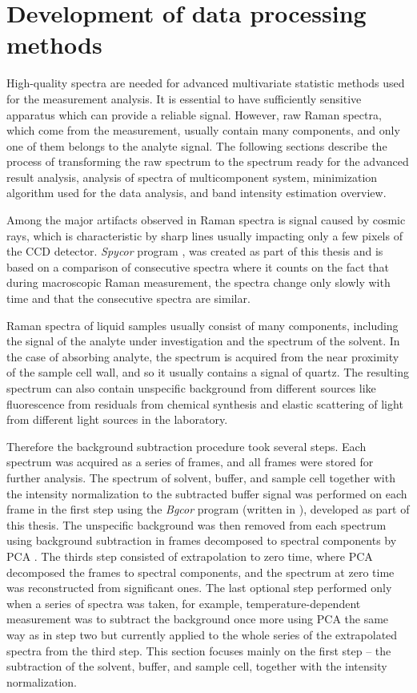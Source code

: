 \section{Development of data processing methods}
\label{data_processing}

High-quality spectra are needed for advanced multivariate statistic methods
used for the measurement analysis.
It is essential to have sufficiently sensitive apparatus which can provide a
reliable signal.
However, raw Raman spectra, which come from the measurement, usually contain
many components, and only one of them belongs to the analyte signal.
The following sections describe the process of transforming the raw spectrum
to the spectrum ready for the advanced result analysis, analysis
of spectra of multicomponent system, minimization algorithm used for the
data analysis, and band intensity estimation overview.

Among the major artifacts observed in Raman spectra is signal caused by cosmic
rays, which is characteristic by sharp lines usually impacting only a few
pixels of the CCD detector.
\emph{Spycor} program
\parencite{Spycor2018},
was created as part of this thesis and is based on a comparison of consecutive
spectra where it counts on the fact that during macroscopic Raman measurement,
the spectra change only slowly with time and that the consecutive spectra are
similar.

Raman spectra of liquid samples usually consist of many components, including
the signal of the analyte under investigation and the spectrum of the solvent.
In the case of absorbing analyte, the spectrum
is acquired from the near proximity of the sample cell wall, and so it
usually contains a signal of quartz.
The resulting spectrum can also contain unspecific background from different
sources like fluorescence from residuals from chemical synthesis and elastic
scattering of light from different light sources in the laboratory.

Therefore the background subtraction procedure took several steps.
Each spectrum was acquired as a series of frames, and all frames were stored
for further analysis.
The spectrum of solvent, buffer, and sample cell together with the intensity
normalization to the subtracted buffer signal was performed on each frame in
the first step using the \emph{Bgcor} program
\parencite{Bgcor2017}
(written in \cite{Matlab}),
developed as part of this thesis. The unspecific background was then removed
from each spectrum using background subtraction in frames decomposed to
spectral components by PCA
\parencite{Palacky2011}.
The thirds step consisted of extrapolation to zero time, where PCA decomposed
the frames to spectral components, and the spectrum at zero time
was reconstructed from significant ones.
The last optional step performed only when a series of spectra was
taken, for example, temperature-dependent measurement was to subtract the
background once more using PCA the same way as in step two but currently
applied to the whole series of the extrapolated spectra from the third step.
This section focuses mainly on the first step -- the subtraction of the
solvent, buffer, and sample cell, together with the intensity normalization.

